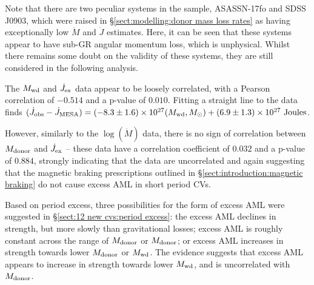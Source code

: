 Note that there are two peculiar systems in the sample, ASASSN-17fo and SDSS J0903, which were raised in \S\ref{sect:modelling:donor mass loss rates} as having exceptionally low $\dot M$ and $\dot J$ estimates. Here, it can be seen that these systems appear to have sub-GR angular momentum loss, which is unphysical. Whilst there remains some doubt on the validity of these systems, they are still considered in the following analysis.

The $M_{\rm wd}$ and $\dot J_{\rm ex}$ data appear to be loosely correlated, with a Pearson correlation of $-0.514$ and a p-value of $0.010$. Fitting a straight line to the data finds $(\dot J_{\rm obs} - \dot J_{\rm MESA}) = (-8.3\pm1.6) \times 10^{27}(M_{\rm wd}, M_\odot) + (6.9\pm1.3)\times10^{27}~{\rm Joules}$.

However, similarly to the $\log (\dot M)$ data, there is no sign of correlation between $M_{\rm donor}$ and $\dot J_{\rm ex}$ -- these data have a correlation coefficient of $0.032$ and a p-value of $0.884$, strongly indicating that the data are uncorrelated and again suggesting that the magnetic braking prescriptions outlined in \S\ref{sect:introduction:magnetic braking} do not cause excess AML in short period CVs.

Based on period excess, three possibilities for the form of excess AML were suggested in \S\ref{sect:12 new cvs:period excess}: the excess AML declines in strength, but more slowly than gravitational losses; excess AML is roughly constant across the range of $M_{\rm donor}$ or $M_{\rm donor}$; or excess AML increases in strength towards lower $M_{\rm donor}$ or $M_{\rm wd}$.
The evidence suggests that excess AML appears to increase in strength towards lower $M_{\rm wd}$, and is uncorrelated with $M_{\rm donor}$.



